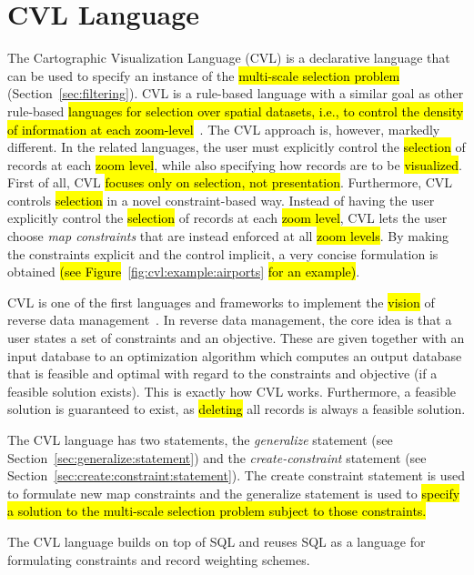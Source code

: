 \section{CVL Language}
\label{sec:cvl:language}
The Cartographic Visualization Language (CVL) is a declarative language that can be used to specify an instance of the \hl{multi-scale selection problem} (Section~\ref{sec:filtering}). CVL is a rule-based language with a similar goal as other rule-based \hl{languages for selection over spatial datasets, i.e., to control the density of information at each zoom-level}~\cite{sld,mapnik}. The CVL approach is, however, markedly different. In the related languages, the user must explicitly control the \hl{selection} of records at each \hl{zoom level}, while also specifying how records are to be \hl{visualized}. First of all, CVL \hl{focuses only on selection, not presentation}. Furthermore, CVL controls \hl{selection} in a novel constraint-based way. Instead of having the user explicitly control the \hl{selection} of records at each \hl{zoom level}, CVL lets the user choose \emph{map constraints} that are instead enforced at all \hl{zoom levels}. By making the constraints explicit and the control implicit, a very concise formulation is obtained \hl{(see Figure}~\ref{fig:cvl:example:airports}\hl{ for an example)}.

CVL is one of the first languages and frameworks to implement the \hl{vision} of reverse data management~\cite{meliou2011reverse}. In reverse data management, the core idea is that a user states a set of constraints and an objective. These are given together with an input database to an optimization algorithm which computes an output database that is feasible and optimal with regard to the constraints and objective (if a feasible solution exists). This is exactly how CVL works. Furthermore, a feasible solution is guaranteed to exist, as \hl{deleting} all records is always a feasible solution.

The CVL language has two statements, the \emph{generalize} statement (see Section~\ref{sec:generalize:statement}) and the \emph{create-constraint} statement (see Section~\ref{sec:create:constraint:statement}). The create constraint statement is used to formulate new map constraints and the generalize statement is used to \hl{specify a solution to the multi-scale selection problem subject to those constraints.} 

The CVL language builds on top of SQL and reuses SQL as a language for formulating constraints and record weighting schemes.

